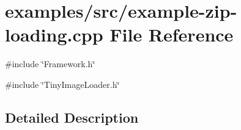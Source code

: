 \hypertarget{example-zip-loading_8cpp}{
\section{examples/src/example-\/zip-\/loading.cpp File Reference}
\label{example-zip-loading_8cpp}
}
{\ttfamily \#include \char`\"{}Framework.h\char`\"{}}\par
{\ttfamily \#include \char`\"{}TinyImageLoader.h\char`\"{}}\par


\subsection{Detailed Description}
